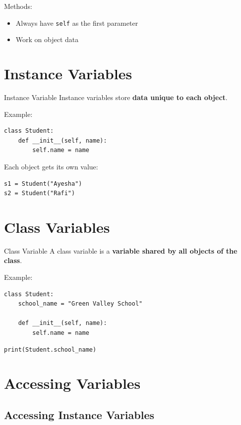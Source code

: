 Methods:
\begin{itemize}
    \item Always have \texttt{self} as the first parameter
    \item Work on object data
\end{itemize}

\section{Instance Variables}

\begin{definition}{Instance Variable}
Instance variables store \textbf{data unique to each object}.
\end{definition}

Example:
\begin{verbatim}
class Student:
    def __init__(self, name):
        self.name = name
\end{verbatim}

Each object gets its own value:
\begin{verbatim}
s1 = Student("Ayesha")
s2 = Student("Rafi")
\end{verbatim}

\section{Class Variables}

\begin{definition}{Class Variable}
A class variable is a \textbf{variable shared by all objects of the class}.
\end{definition}

Example:
\begin{verbatim}
class Student:
    school_name = "Green Valley School"

    def __init__(self, name):
        self.name = name
\end{verbatim}

\begin{verbatim}
print(Student.school_name)
\end{verbatim}

\section{Accessing Variables}

\subsection{Accessing Instance Variables}

